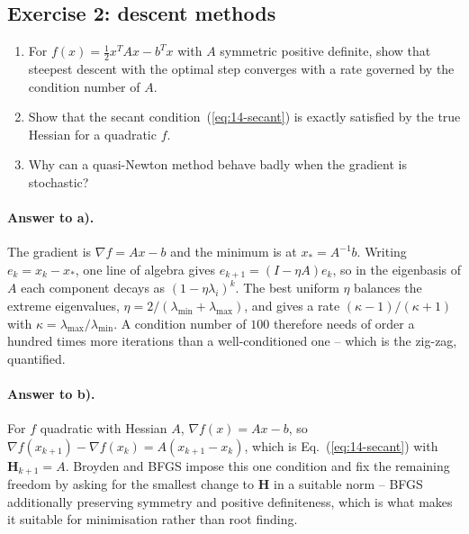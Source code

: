 \subsection*{Exercise 2: descent methods}
\label{ex:14-descent}

\begin{enumerate}
  \item[a)] For $f(x)=\tfrac12 x^{T}Ax - b^{T}x$ with $A$ symmetric positive
  definite, show that steepest descent with the optimal step converges with a
  rate governed by the condition number of $A$.
  \item[b)] Show that the secant condition~(\ref{eq:14-secant}) is exactly
  satisfied by the true Hessian for a quadratic $f$.
  \item[c)] Why can a quasi-Newton method behave badly when the gradient is
  stochastic?
\end{enumerate}

\paragraph{Answer to a).}
The gradient is $\nabla f = Ax-b$ and the minimum is at $x_{*}=A^{-1}b$.
Writing $e_k=x_k-x_{*}$, one line of algebra gives
$e_{k+1}=(I-\eta A)e_k$, so in the eigenbasis of $A$ each component decays as
$(1-\eta\lambda_i)^k$.  The best uniform $\eta$ balances the extreme
eigenvalues, $\eta=2/(\lambda_{\min}+\lambda_{\max})$, and gives a rate
$(\kappa-1)/(\kappa+1)$ with $\kappa=\lambda_{\max}/\lambda_{\min}$.  A
condition number of $100$ therefore needs of order a hundred times more
iterations than a well-conditioned one -- which is the zig-zag, quantified.

\paragraph{Answer to b).}
For $f$ quadratic with Hessian $A$, $\nabla f(x)=Ax-b$, so
$\nabla f(x_{k+1})-\nabla f(x_k) = A(x_{k+1}-x_k)$, which is
Eq.~(\ref{eq:14-secant}) with $\bm{H}_{k+1}=A$.  Broyden and BFGS impose this
one condition and fix the remaining freedom by asking for the smallest change
to $\bm{H}$ in a suitable norm -- BFGS additionally preserving symmetry and
positive definiteness, which is what makes it suitable for minimisation rather
than root finding.

